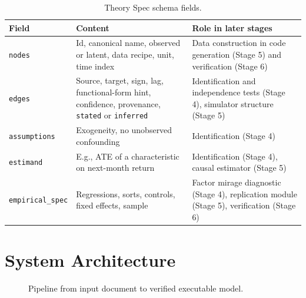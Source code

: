   \begin{table}[H]
    \centering
    \begin{tabularx}{\linewidth}{lXX}
      \toprule
      Field & Content & Role in later stages \\
      \midrule
      \texttt{nodes} & Id, canonical name, observed or latent, data recipe,
      unit, time index & Data construction in code generation (Stage 5) and
      verification (Stage 6) \\
      \texttt{edges} & Source, target, sign, lag, functional-form hint,
      confidence, provenance, \texttt{stated} or \texttt{inferred} &
      Identification and independence tests (Stage 4), simulator structure
      (Stage 5) \\
      \texttt{assumptions} & Exogeneity, no unobserved confounding &
      Identification (Stage 4) \\
      \texttt{estimand} & E.g., ATE of a characteristic on next-month return
      & Identification (Stage 4), causal estimator (Stage 5) \\
      \texttt{empirical\_spec} & Regressions, sorts, controls, fixed effects,
      sample & Factor mirage diagnostic (Stage 4), replication module
      (Stage 5), verification (Stage 6) \\
      \bottomrule
    \end{tabularx}
    \caption{Theory Spec schema fields.}
    \label{tab:theory_spec_fields}
  \end{table}

  \section{System Architecture}\label{sec:architecture}

  \begin{figure}[H]
    \centering
    \caption{Pipeline from input document to verified executable model.}
    \label{fig:pipeline}
  \end{figure}


